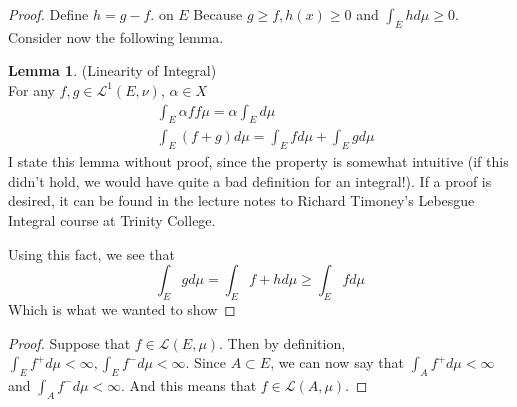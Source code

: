 \documentclass[12pt]{article}
\newenvironment{problem}[2][Problem]{\begin{trivlist}
\item[\hskip \labelsep {\bfseries #1}\hskip \labelsep {\bfseries #2.}]}{\end{trivlist}}
\theoremstyle{definition}
\theoremstyle{definition}
\newtheorem{lemma}{Lemma}[section]
\theoremstyle{definition}
\theoremstyle{definition}
\begin{document}
\begin{problem}{4.15}
\begin{proof}
Define $h = g - f.$ on $E$ Because $g \geq f, h(x) \geq 0$  and $\int_E hd\mu \geq 0 $. Consider now the following lemma.
\begin{lemma} (Linearity of Integral) \\
For any $f, g \in \mathcal{L}^1(E, \nu)$, $\alpha \in X$ 
\begin{align*}
&\int_E \alpha f f \mu = \alpha \int_E d \mu \\
&\int_E (f + g) d \mu = \int_E f d \mu + \int_E g d\mu
\end{align*}
I state this lemma without proof, since the property is somewhat intuitive (if this didn't hold, we would have quite a bad definition for an integral!). If a proof is desired, it can be found in the lecture notes to Richard Timoney's Lebesgue Integral course at Trinity College.
\end{lemma}
Using this fact, we see that 
$$\int_E g d\mu = \int_E f+h d\mu \geq \int_E f d\mu$$ 
Which is what we wanted to show
\end{proof}
\end{problem}

\begin{problem}{4.16}
\begin{proof}
Suppose that $f \in \mathcal{L}(E, \mu)$. Then by definition, $ \int_E f^+ d\mu < \infty, \int_E f^- d\mu < \infty$. Since $A \subset E$, we can now say that $\int_A f^+ d\mu < \infty$ and $\int_A f^- d\mu < \infty$. And this means that $f \in \mathcal{L}(A, \mu)$.
\end{proof}
\end{problem}

\begin{problem}{4.21}
\end{problem}
\end{document}
